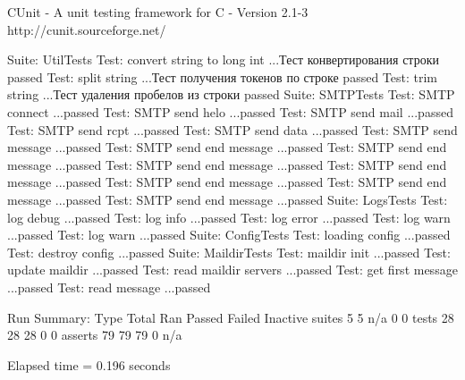 

     CUnit - A unit testing framework for C - Version 2.1-3
     http://cunit.sourceforge.net/


Suite: UtilTests
  Test: convert string to long int ...Тест конвертирования строки
passed
  Test: split string ...Тест получения токенов по строке
passed
  Test: trim string ...Тест удаления пробелов из строки
passed
Suite: SMTPTests
  Test: SMTP connect ...passed
  Test: SMTP send helo ...passed
  Test: SMTP send mail ...passed
  Test: SMTP send rcpt ...passed
  Test: SMTP send data ...passed
  Test: SMTP send message ...passed
  Test: SMTP send end message ...passed
  Test: SMTP send end message ...passed
  Test: SMTP send end message ...passed
  Test: SMTP send end message ...passed
  Test: SMTP send end message ...passed
  Test: SMTP send end message ...passed
  Test: SMTP send end message ...passed
Suite: LogsTests
  Test: log debug ...passed
  Test: log info ...passed
  Test: log error ...passed
  Test: log warn ...passed
  Test: log warn ...passed
Suite: ConfigTests
  Test: loading config ...passed
  Test: destroy config ...passed
Suite: MaildirTests
  Test: maildir init ...passed
  Test: update maildir ...passed
  Test: read maildir servers ...passed
  Test: get first message ...passed
  Test: read message ...passed

Run Summary:    Type  Total    Ran Passed Failed Inactive
              suites      5      5    n/a      0        0
               tests     28     28     28      0        0
             asserts     79     79     79      0      n/a

Elapsed time =    0.196 seconds
